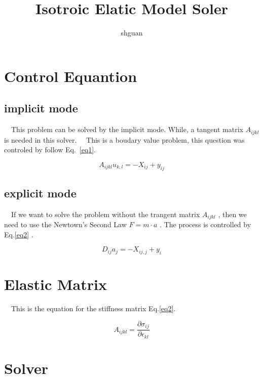 \documentclass[12pt]{extarticle}
\begin{document}
\title{Isotroic Elatic Model Soler}
\author{shguan}
\maketitle

\section{Control Equantion}
\subsection{implicit mode}
\ \ This problem can be solved by the implicit mode. While, a tangent matrix $A_{ijkl}$ is needed in this solver.
\ \ This is a boudary value problem, this question was controled by follow Eq.\ \ref{eq1}.


\begin{equation}\label{eq1}
A_{ijkl} u_{k,l}=-X_{ij}+y_{ij}
\end{equation}

\subsection{explicit mode}
\ \ If we want to solve the problem without the trangent matrix $A_{ijkl}$ , then we need to use the Newtown's Second Law $F=m\cdot a$ . The process is controlled by Eq.\ref{eq2} . 

\begin{equation}\label{eq2}
D_{ij} a_{j}=-X_{ij,j}+y_{i}
\end{equation}


\section{Elastic Matrix}
\ \ This is the equation for the stiffness matrix Eq.\ref{eq2}.

\begin{Large}
\begin{equation} \label{eq3}
A_{ijkl}=\frac{\partial \sigma_{ij}} {\partial \epsilon_{kl}}
\end{equation}
\end{Large}

\section{Solver}
\end{document}
